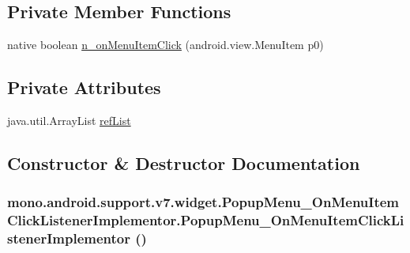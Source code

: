 \subsection*{Private Member Functions}
\begin{CompactItemize}
\item 
native boolean \hyperlink{classmono_1_1android_1_1support_1_1v7_1_1widget_1_1_popup_menu___on_menu_item_click_listener_implementor_6a1ae0391f2a751c58479e4c8cf8c128}{n\_\-onMenuItemClick} (android.view.MenuItem p0)
\end{CompactItemize}
\subsection*{Private Attributes}
\begin{CompactItemize}
\item 
java.util.ArrayList \hyperlink{classmono_1_1android_1_1support_1_1v7_1_1widget_1_1_popup_menu___on_menu_item_click_listener_implementor_1fed170d302a3246c7e218aafb89d9d8}{refList}
\end{CompactItemize}


\subsection{Constructor \& Destructor Documentation}
\hypertarget{classmono_1_1android_1_1support_1_1v7_1_1widget_1_1_popup_menu___on_menu_item_click_listener_implementor_b88fbdb496d9cf5ecbbaa116db45b71d}{
\subsubsection[{PopupMenu\_\-OnMenuItemClickListenerImplementor}]{\setlength{\rightskip}{0pt plus 5cm}mono.android.support.v7.widget.PopupMenu\_\-OnMenuItemClickListenerImplementor.PopupMenu\_\-OnMenuItemClickListenerImplementor ()}}
\label{classmono_1_1android_1_1support_1_1v7_1_1widget_1_1_popup_menu___on_menu_item_click_listener_implementor_b88fbdb496d9cf5ecbbaa116db45b71d}




